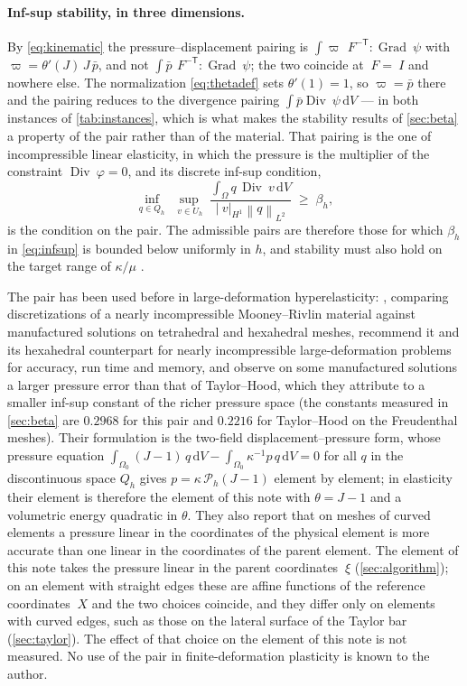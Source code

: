 \documentclass{article}
\newcommand{\F}{~F}
\newcommand{\Id}{~I}
\newcommand{\disp}{~\varphi}
\newcommand{\testd}{~\psi}
\newcommand{\bX}{~X}
\newcommand{\Grad}{\operatorname{Grad}}
\newcommand{\Div}{\operatorname{Div}}
\newcommand{\norm}[1]{\left\lVert #1 \right\rVert}
\newcommand{\diff}{\,\mathrm{d}}
\theoremstyle{definition}
\theoremstyle{plain}
\begin{document}
\paragraph{Inf-sup stability, in three dimensions.} By \eqref{eq:kinematic} the
pressure--displacement pairing is
$\int \varpi \,\F^{-\mathsf T}\!:\!\Grad\testd$ with
$\varpi = \theta'(J)\,J\,\bar p$, and not $\int \bar p
\,\F^{-\mathsf T}\!:\!\Grad\testd$; the two coincide at $\F = \Id$ and nowhere
else. The normalization \eqref{eq:thetadef} sets $\theta'(1) = 1$, so
$\varpi = \bar p$ there and the pairing reduces to the divergence pairing
$\int \bar p \Div\testd \diff V$ --- in both instances of
\cref{tab:instances}, which is what makes the stability results of
\cref{sec:beta} a property of the pair rather than of the material. That
pairing is the one of incompressible linear elasticity, in which the pressure
is the multiplier of the constraint $\Div\disp = 0$, and its discrete
inf-sup condition,
\begin{equation}
  \label{eq:infsup}
  \inf_{q \in Q_h}\;\sup_{~v \in U_h}\;
  \frac{\int_\Omega q \, \Div ~v \diff V}{\lvert ~v \rvert_{H^1} \norm{q}_{L^2}}
  \;\ge\; \beta_h ,
\end{equation}
is the condition on the pair. The admissible pairs are therefore those for
which $\beta_h$ in \eqref{eq:infsup} is bounded below uniformly in $h$, and
stability must also hold on the target range of $\kappa/\mu$
\cite{BoffiBrezziFortin:2013}.

The pair has been used before in large-deformation hyperelasticity:
\textcite{ChamberlandFortinFortin:2010}, comparing discretizations of a
nearly incompressible Mooney--Rivlin material against manufactured
solutions on tetrahedral and hexahedral meshes, recommend it and its
hexahedral counterpart for nearly incompressible large-deformation problems
for accuracy, run time and memory, and observe on some manufactured
solutions a larger pressure error than that of Taylor--Hood, which they
attribute to a smaller inf-sup constant of the richer pressure space (the
constants measured in \cref{sec:beta} are $0.2968$ for this pair and $0.2216$
for Taylor--Hood on the Freudenthal meshes). Their formulation is the
two-field displacement--pressure form, whose pressure equation
$\int_{\Omega_0} (J - 1)\, q \diff V - \int_{\Omega_0} \kappa^{-1} p\, q
\diff V = 0$ for all $q$ in the discontinuous space $Q_h$ gives $p =
\kappa\, \mathcal{P}_h(J - 1)$ element by element; in elasticity their
element is therefore the element of this note with $\theta = J - 1$ and a
volumetric energy quadratic in $\theta$. They also report that on meshes
of curved elements a pressure linear in the coordinates of the physical
element is more accurate than one linear in the coordinates of the parent
element. The element of this note takes the pressure linear in the
parent coordinates $~\xi$ (\cref{sec:algorithm}); on an element with
straight edges these are affine functions of the reference coordinates
$\bX$ and the two choices coincide, and they differ only on elements with
curved edges, such as those on the lateral surface of the Taylor bar
(\cref{sec:taylor}). The effect of that choice on the element of this
note is not measured. No use of the pair in finite-deformation plasticity
is known to the author.
\end{document}
